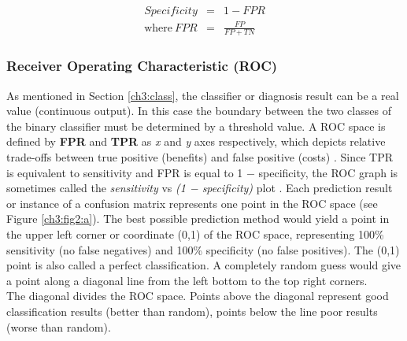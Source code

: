 \begin{eqnarray}
 Specificity & = & 1 - FPR\\
 \textrm{where} \ FPR & = & \frac{FP}{FP + TN}
\end{eqnarray}

\vspace{0.5cm}

\subsubsection{Receiver Operating Characteristic (ROC)}
\label{ch3:roc}

As mentioned in Section \ref{ch3:class}, the classifier or diagnosis result can be a real value (continuous output).
In this case the boundary between the two classes of the binary classifier must be determined by a threshold value.\newline
A \Gls{ROC} space is defined by \textbf{FPR} and \textbf{TPR} as \textit{x} and \textit{y} axes respectively, which depicts relative trade-offs between true positive (benefits) and false positive (costs) \cite{ROC01}.
Since TPR is equivalent to sensitivity and FPR is equal to 1 − specificity, the ROC graph is sometimes called the \textit{sensitivity} vs \textit{(1 − specificity)} plot \cite{ROC_precision_recall}.
Each prediction result or instance of a confusion matrix represents one point in the ROC space (see Figure \ref{ch3:fig2:a}).\newline
The best possible prediction method would yield a point in the upper left corner or coordinate (0,1) of the ROC space, representing 100\% sensitivity (no false negatives)
and 100\% specificity (no false positives). The (0,1) point is also called a perfect classification. A completely random guess would give a point along a diagonal line
from the left bottom to the top right corners.\\
The diagonal divides the \Gls{ROC} space. Points above the diagonal represent good classification results (better than random),
points below the line poor results (worse than random).

